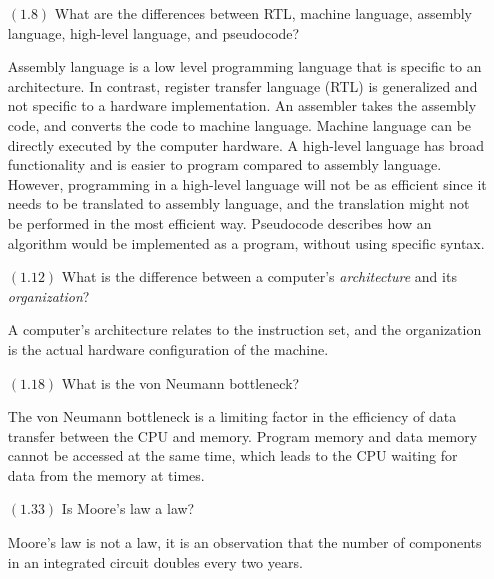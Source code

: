 \documentclass[letterpaper,10pt,titlepage]{article}
\begin{document}
\begin{enumerate}
\item[$(1.8)$] What are the differences between RTL, machine language, assembly language,
  high-level language, and pseudocode?
  
  Assembly language is a low level programming language that is specific to an architecture.
  In contrast, register transfer language (RTL) is generalized and not specific to a hardware implementation.
  An assembler takes the assembly code, and converts the code to machine language.  Machine language can be
  directly executed by the computer hardware.
  A high-level language has broad functionality and is easier to program compared to assembly language.
  However, programming in a high-level language will not be as efficient since it needs to be translated to 
  assembly language, and the translation might not be performed in the most efficient way.
  Pseudocode describes how an algorithm would be implemented as a program, without using specific syntax.
  
  
\item[$(1.12)$]What is the difference between a computer's \textit{architecture} and its
  \textit{organization}?
  
  A computer's architecture relates to the instruction set, and the organization is the actual hardware configuration of the machine.
  
\item[$(1.18)$]What is the von Neumann bottleneck?

  The von Neumann bottleneck is a limiting factor in the efficiency of data transfer between the CPU and memory.
  Program memory and data memory cannot be accessed at the same time, which leads to the CPU waiting for data from the memory at times.

\item[$(1.33)$]Is Moore's law a law?

  Moore's law is not a law, it is an observation that the number of components in an integrated circuit doubles every two years.

\end{enumerate}
\end{document}
